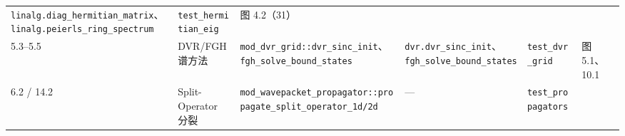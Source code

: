 \documentclass[
]{ctexbook}
\begin{document}
\begin{longtable}[]{@{}llllll@{}}
\begin{minipage}[t]{0.14\columnwidth}
\texttt{linalg.diag\_hermitian\_matrix}、\texttt{linalg.peierls\_ring\_spectrum}\strut
\end{minipage} & \begin{minipage}[t]{0.14\columnwidth}\raggedright
\texttt{test\_hermitian\_eig}\strut
\end{minipage} & \begin{minipage}[t]{0.14\columnwidth}\raggedright
图 4.2（31）\strut
\end{minipage}\tabularnewline
\begin{minipage}[t]{0.14\columnwidth}\raggedright
5.3--5.5\strut
\end{minipage} & \begin{minipage}[t]{0.14\columnwidth}\raggedright
DVR/FGH 谱方法\strut
\end{minipage} & \begin{minipage}[t]{0.14\columnwidth}\raggedright
\texttt{mod\_dvr\_grid::dvr\_sinc\_init}、\texttt{fgh\_solve\_bound\_states}\strut
\end{minipage} & \begin{minipage}[t]{0.14\columnwidth}\raggedright
\texttt{dvr.dvr\_sinc\_init}、\texttt{fgh\_solve\_bound\_states}\strut
\end{minipage} & \begin{minipage}[t]{0.14\columnwidth}\raggedright
\texttt{test\_dvr\_grid}\strut
\end{minipage} & \begin{minipage}[t]{0.14\columnwidth}\raggedright
图 5.1、10.1\strut
\end{minipage}\tabularnewline
\begin{minipage}[t]{0.14\columnwidth}\raggedright
6.2 / 14.2\strut
\end{minipage} & \begin{minipage}[t]{0.14\columnwidth}\raggedright
Split-Operator 分裂\strut
\end{minipage} & \begin{minipage}[t]{0.14\columnwidth}\raggedright
\texttt{mod\_wavepacket\_propagator::propagate\_split\_operator\_1d/2d}\strut
\end{minipage} & \begin{minipage}[t]{0.14\columnwidth}\raggedright
---\strut
\end{minipage} & \begin{minipage}[t]{0.14\columnwidth}\raggedright
\texttt{test\_propagators}\strut
\end{minipage} & \begin{minipage}[t]{0.14\columnwidth}\raggedright

\end{minipage}
\end{longtable}
\end{document}
